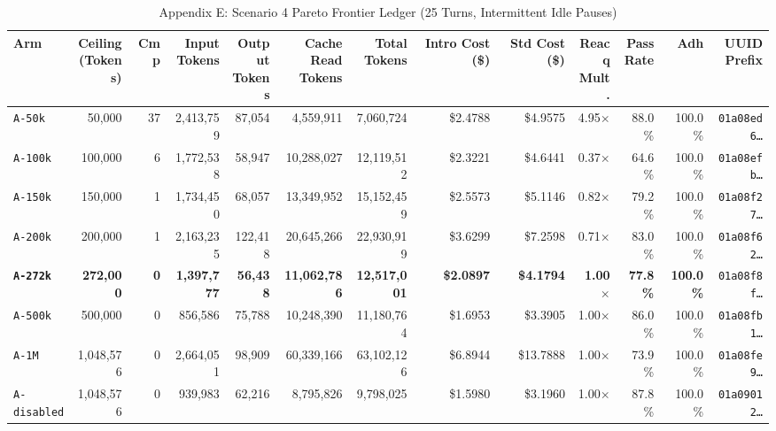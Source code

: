\documentclass[10pt,twocolumn,a4paper]{article}
\begin{document}
\begin{table}[t]
\caption{Appendix E: Scenario 4 Pareto Frontier Ledger (25 Turns, Intermittent Idle Pauses)}
\label{tab:app_scenario4_ledger}
\centering
\scriptsize
\setlength{\tabcolsep}{2.2pt}
\begin{tabular}{@{}lrrrrrrrrrrrr@{}}
\toprule
\textbf{Arm} & \shortstack{\textbf{Ceiling}\\\textbf{(Tokens)}} & \textbf{Cmp} & \shortstack{\textbf{Input}\\\textbf{Tokens}} & \shortstack{\textbf{Output}\\\textbf{Tokens}} & \shortstack{\textbf{Cache Read}\\\textbf{Tokens}} & \shortstack{\textbf{Total}\\\textbf{Tokens}} & \shortstack{\textbf{Intro Cost}\\\textbf{(\$)}} & \shortstack{\textbf{Std Cost}\\\textbf{(\$)}} & \shortstack{\textbf{Reacq}\\\textbf{Mult.}} & \shortstack{\textbf{Pass}\\\textbf{Rate}} & \textbf{Adh} & \shortstack{\textbf{UUID}\\\textbf{Prefix}} \\
\midrule
\texttt{A-50k} & 50,000 & 37 & 2,413,759 & 87,054 & 4,559,911 & 7,060,724 & \$2.4788 & \$4.9575 & 4.95$\times$ & 88.0\% & 100.0\% & \texttt{01a08ed6\dots} \\
\texttt{A-100k} & 100,000 & 6 & 1,772,538 & 58,947 & 10,288,027 & 12,119,512 & \$2.3221 & \$4.6441 & 0.37$\times$ & 64.6\% & 100.0\% & \texttt{01a08efb\dots} \\
\texttt{A-150k} & 150,000 & 1 & 1,734,450 & 68,057 & 13,349,952 & 15,152,459 & \$2.5573 & \$5.1146 & 0.82$\times$ & 79.2\% & 100.0\% & \texttt{01a08f27\dots} \\
\texttt{A-200k} & 200,000 & 1 & 2,163,235 & 122,418 & 20,645,266 & 22,930,919 & \$3.6299 & \$7.2598 & 0.71$\times$ & 83.0\% & 100.0\% & \texttt{01a08f62\dots} \\
\textbf{\texttt{A-272k}} & \textbf{272,000} & \textbf{0} & \textbf{1,397,777} & \textbf{56,438} & \textbf{11,062,786} & \textbf{12,517,001} & \textbf{\$2.0897} & \textbf{\$4.1794} & \textbf{1.00$\times$} & \textbf{77.8\%} & \textbf{100.0\%} & \texttt{01a08f8f\dots} \\
\texttt{A-500k} & 500,000 & 0 & 856,586 & 75,788 & 10,248,390 & 11,180,764 & \$1.6953 & \$3.3905 & 1.00$\times$ & 86.0\% & 100.0\% & \texttt{01a08fb1\dots} \\
\texttt{A-1M} & 1,048,576 & 0 & 2,664,051 & 98,909 & 60,339,166 & 63,102,126 & \$6.8944 & \$13.7888 & 1.00$\times$ & 73.9\% & 100.0\% & \texttt{01a08fe9\dots} \\
\texttt{A-disabled} & 1,048,576 & 0 & 939,983 & 62,216 & 8,795,826 & 9,798,025 & \$1.5980 & \$3.1960 & 1.00$\times$ & 87.8\% & 100.0\% & \texttt{01a09012\dots} \\
\bottomrule
\end{tabular}
\end{table}
\end{document}
